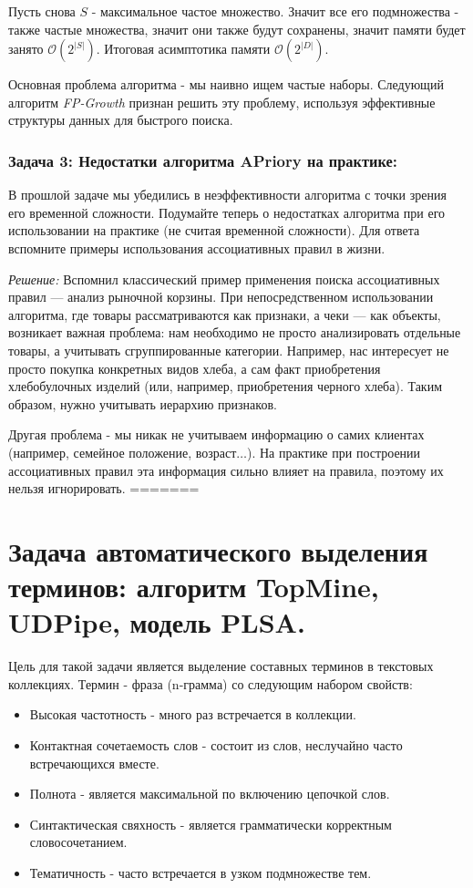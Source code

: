 Пусть снова \(S\) - максимальное частое множество. Значит все его подмножества - также частые множества, значит они также будут сохранены, значит памяти будет занято \(\mathcal{O}(2^{|S|})\). Итоговая асимптотика памяти \(\mathcal{O}(2^{|D|})\).

Основная проблема алгоритма - мы наивно ищем частые наборы. Следующий алгоритм \textit{FP-Growth} признан решить эту проблему, используя эффективные структуры данных для быстрого поиска.

\subsubsection{Задача 3: Недостатки алгоритма APriory на практике:} В прошлой задаче мы убедились в неэффективности алгоритма с точки зрения его временной сложности. Подумайте теперь о недостатках алгоритма при его использовании на практике (не считая временной сложности). Для ответа вспомните примеры использования ассоциативных правил в жизни.

\textit{Решение:} Вспомнил классический пример применения поиска ассоциативных правил — анализ рыночной корзины. При непосредственном использовании алгоритма, где товары рассматриваются как признаки, а чеки — как объекты, возникает важная проблема: нам необходимо не просто анализировать отдельные товары, а учитывать сгруппированные категории. Например, нас интересует не просто покупка конкретных видов хлеба, а сам факт приобретения хлебобулочных изделий (или, например, приобретения черного хлеба). Таким образом, нужно учитывать иерархию признаков.

Другая проблема - мы никак не учитываем информацию о самих клиентах (например, семейное положение, возраст\(\ldots\)). На практике при построении ассоциативных правил эта информация сильно влияет на правила, поэтому их нельзя игнорировать.
=======
\section{Задача автоматического выделения терминов: алгоритм TopMine, UDPipe, модель PLSA.}

Цель для такой задачи является выделение составных терминов в текстовых коллекциях. Термин - фраза (n-грамма) со следующим набором свойств:

\begin{itemize}
	\item Высокая частотность - много раз встречается в коллекции.
	\item Контактная сочетаемость слов - состоит из слов, неслучайно часто встречающихся вместе.
	\item Полнота - является максимальной по включению цепочкой слов.
	\item Синтактическая свяхность - является грамматически корректным словосочетанием.
	\item Тематичность - часто встречается в узком подмножестве тем.
\end{itemize}

